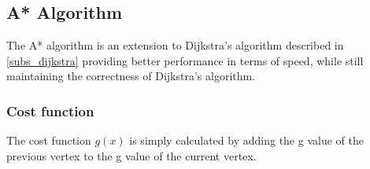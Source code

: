 





  \subsection{A* Algorithm}\label{subs_astar}


  The A* algorithm is an extension to Dijkstra's algorithm described in \cref{subs_dijkstra} providing better performance in terms of speed, while still maintaining the correctness of Dijkstra's algorithm.

  \subsubsection{Cost function}
  The cost function $g(x)$ is simply calculated by adding the g value of the previous vertex to the g value of the current vertex.

